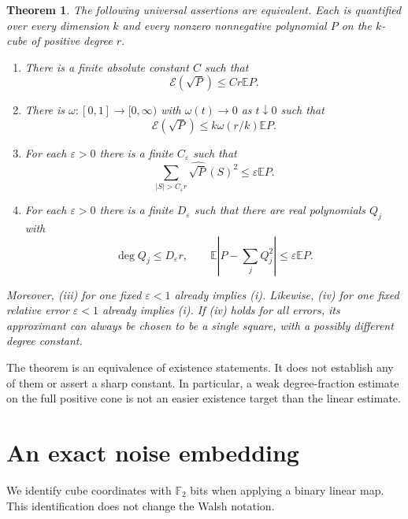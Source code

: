 \documentclass[10pt]{article}
\newtheorem{theorem}{Theorem}
\newcommand{\E}{\mathbb E}
\newcommand{\En}{\mathcal E}
\newcommand{\F}{\mathbb F}
\begin{document}
\begin{theorem}\label{thm:equivalence}
The following universal assertions are equivalent. Each is quantified
over every dimension $k$ and every nonzero nonnegative polynomial $P$
on the $k$-cube of positive degree $r$.
\begin{enumerate}[label=(\roman*),leftmargin=*]
\item There is a finite absolute constant $C$ such that
\[
 \En(\sqrt P)\le Cr\E P.
\]
\item There is $\omega:[0,1]\to[0,\infty)$ with $\omega(t)\to0$
as $t\downarrow0$ such that
\[
 \En(\sqrt P)\le k\omega(r/k)\E P.
\]
\item For each $\varepsilon>0$ there is a finite $C_\varepsilon$ such that
\[
 \sum_{|S|>C_\varepsilon r}\widehat{\sqrt P}(S)^2
       \le\varepsilon\E P.
\]
\item For each $\varepsilon>0$ there is a finite $D_\varepsilon$ such that
there are real polynomials $Q_j$ with
\[
 \deg Q_j\le D_\varepsilon r,\qquad
 \E\left|P-\sum_jQ_j^2\right|\le\varepsilon\E P.
\]
\end{enumerate}
Moreover, (iii) for one fixed $\varepsilon<1$ already implies (i).
Likewise, (iv) for one fixed relative error $\varepsilon<1$ already
implies (i). If (iv) holds for all errors, its approximant can always
be chosen to be a single square, with a possibly different degree constant.
\end{theorem}

The theorem is an equivalence of existence statements. It does not
establish any of them or assert a sharp constant. In particular,
a weak degree-fraction estimate on the full positive cone is not an
easier existence target than the linear estimate.

\section{An exact noise embedding}
We identify cube coordinates with $\F_2$ bits when applying a binary
linear map. This identification does not change the Walsh notation.
\end{document}
